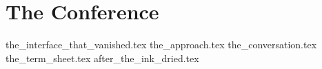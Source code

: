 \part{The Conference}


{the_interface_that_vanished.tex}
{the_approach.tex}
{the_conversation.tex}
{the_term_sheet.tex}
{after_the_ink_dried.tex}